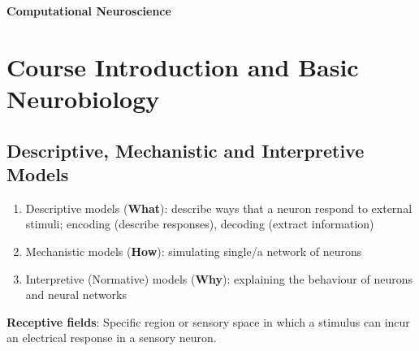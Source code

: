 \documentclass[11pt]{article}
\begin{document}
\begin{center}
    \begin{large}
        \textbf{Computational Neuroscience}
    \end{large}
\end{center}

\tableofcontents

\newpage
\section{Course Introduction and Basic Neurobiology}
\subsection{Descriptive, Mechanistic and Interpretive Models}
\begin{enumerate}
    \item Descriptive models (\textbf{What}): describe ways that a neuron respond to external stimuli; encoding (describe responses), decoding (extract information)
    \item Mechanistic models (\textbf{How}): simulating single/a network of neurons
    \item Interpretive (Normative) models (\textbf{Why}): explaining the behaviour of neurons and neural networks
\end{enumerate}
\noindent \textbf{Receptive fields}: Specific region or sensory space in which a stimulus can incur an electrical response in a sensory neuron.
\end{document}
